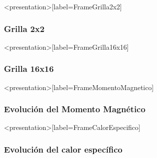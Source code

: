 \documentclass[aspect=169]{beamer}
\begin{document}
\begin{frame}<presentation>[label=FrameGrilla2x2]
  \frametitle{Grilla 2x2}

  \resizebox{\textwidth}{!}{  }

\end{frame}

\begin{frame}<presentation>[label=FrameGrilla16x16]
  \frametitle{Grilla 16x16}
  \resizebox{\textwidth}{!}{  }
  
\end{frame}

\begin{frame}<presentation>[label=FrameMomentoMagnetico]
  \frametitle{Evolución del Momento Magnético}
  \resizebox{\textwidth}{!}{}
\end{frame}

\begin{frame}<presentation>[label=FrameCalorEspecifico]
  \frametitle{Evolución del calor específico}
  \resizebox{\textwidth}{!}{} 
\end{frame}
\end{document}
